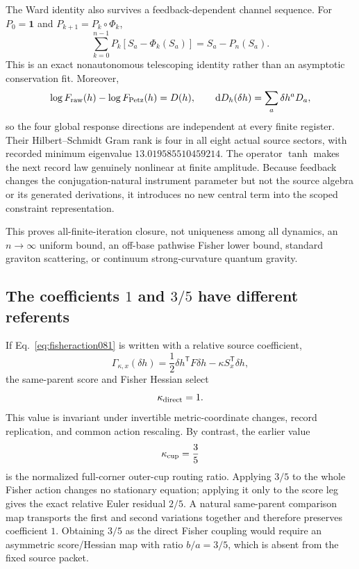 \documentclass[11pt]{article}
\theoremstyle{definition}
\theoremstyle{remark}
\newcommand{\id}{\mathbf{1}}
\begin{document}
The Ward identity also survives a feedback-dependent channel sequence. For $P_0=\id$ and $P_{k+1}=P_k\circ\Phi_k$,
\begin{equation}\label{eq:nonautonomousward09}
 \sum_{k=0}^{n-1}P_k\!\left[S_a-\Phi_k(S_a)\right]
 =S_a-P_n(S_a).
\end{equation}
This is an exact nonautonomous telescoping identity rather than an asymptotic conservation fit. Moreover,
\begin{equation}
 \log F_{\rm raw}(h)-\log F_{\rm Petz}(h)=D(h),
 \qquad
 \mathrm dD_h(\delta h)=\sum_a\delta h^aD_a,
\end{equation}
so the four global response directions are independent at every finite register. Their Hilbert--Schmidt Gram rank is four in all eight actual source sectors, with recorded minimum eigenvalue $13.019585510459214$. The operator $\tanh$ makes the next record law genuinely nonlinear at finite amplitude. Because feedback changes the conjugation-natural instrument parameter but not the source algebra or its generated derivations, it introduces no new central term into the scoped constraint representation.

This proves all-finite-iteration closure, not uniqueness among all dynamics, an $n\to\infty$ uniform bound, an off-base pathwise Fisher lower bound, standard graviton scattering, or continuum strong-curvature quantum gravity.

\subsection{The coefficients $1$ and $3/5$ have different referents}

If Eq.~\eqref{eq:fisheraction081} is written with a relative source coefficient,
\begin{equation}
 \Gamma_{\kappa,x}(\delta h)
 =\frac12\delta h^{\mathsf T}F\delta h
 -\kappa S_x^{\mathsf T}\delta h,
\end{equation}
the same-parent score and Fisher Hessian select
\begin{equation}
 \kappa_{\rm direct}=1.
\end{equation}
This value is invariant under invertible metric-coordinate changes, record replication, and common action rescaling. By contrast, the earlier value
\begin{equation}
 \kappa_{\rm cup}=\frac35
\end{equation}
is the normalized full-corner outer-cup routing ratio. Applying $3/5$ to the whole Fisher action changes no stationary equation; applying it only to the score leg gives the exact relative Euler residual $2/5$. A natural same-parent comparison map transports the first and second variations together and therefore preserves coefficient $1$. Obtaining $3/5$ as the direct Fisher coupling would require an asymmetric score/Hessian map with ratio $b/a=3/5$, which is absent from the fixed source packet.
\end{document}
